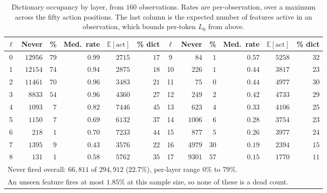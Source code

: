 \begin{table}[t]
\caption{Dictionary occupancy by layer, from $160$ observations. Rates are
per-observation, over a maximum across the fifty action positions. The last
column is the expected number of features active in an observation, which
bounds per-token $L_0$ from above.}
\label{tab:dict-occupancy}
\begin{center}
\small
\setlength{\tabcolsep}{4.5pt}
\begin{tabular}{crrrrr|crrrrr}
\hline
$\ell$ & Never & \% & Med.\ rate & $\mathbb{E}[\mathrm{act}]$ & \% dict &
$\ell$ & Never & \% & Med.\ rate & $\mathbb{E}[\mathrm{act}]$ & \% dict \\
\hline
0 & $12956$ & $79$ & $0.99$ & $2715$ & $17$ & 9  & $84$   & $1$  & $0.57$ & $5258$ & $32$ \\
1 & $12154$ & $74$ & $0.94$ & $2875$ & $18$ & 10 & $226$  & $1$  & $0.44$ & $3817$ & $23$ \\
2 & $11461$ & $70$ & $0.96$ & $3483$ & $21$ & 11 & $75$   & $0$  & $0.44$ & $4977$ & $30$ \\
3 & $8833$  & $54$ & $0.96$ & $4360$ & $27$ & 12 & $249$  & $2$  & $0.42$ & $4733$ & $29$ \\
4 & $1093$  & $7$  & $0.82$ & $7446$ & $45$ & 13 & $623$  & $4$  & $0.33$ & $4106$ & $25$ \\
5 & $1150$  & $7$  & $0.69$ & $6132$ & $37$ & 14 & $1006$ & $6$  & $0.28$ & $3754$ & $23$ \\
6 & $218$   & $1$  & $0.70$ & $7233$ & $44$ & 15 & $877$  & $5$  & $0.26$ & $3977$ & $24$ \\
7 & $1395$  & $9$  & $0.43$ & $3576$ & $22$ & 16 & $4979$ & $30$ & $0.19$ & $2394$ & $15$ \\
8 & $131$   & $1$  & $0.58$ & $5762$ & $35$ & 17 & $9301$ & $57$ & $0.15$ & $1770$ & $11$ \\
\hline
\multicolumn{12}{l}{Never fired overall: $66{,}811$ of $294{,}912$ ($22.7\%$), per-layer range $0\%$ to $79\%$.} \\
\multicolumn{12}{l}{An unseen feature fires at most $1.85\%$ at this sample size, so none of these is a dead count.} \\
\hline
\end{tabular}
\end{center}
\end{table}

